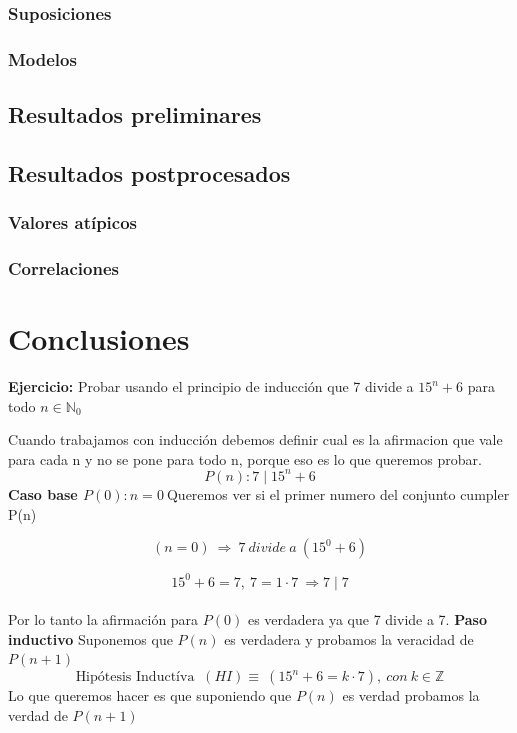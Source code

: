 \documentclass[12pt]{book}
\begin{document}
\subsection{Suposiciones}
\subsection{Modelos}
\section{Resultados preliminares}
\section{Resultados postprocesados}
\subsection{Valores atípicos}
\subsection{Correlaciones}
\chapter{Conclusiones}


\begin{shaded}
\textbf{Ejercicio:} Probar usando el principio de inducción que 7 divide a $ 15^{n} + 6$ para todo $n \in \mathbb N_{0}$  
\end{shaded}

Cuando trabajamos con inducci\'on debemos definir cual es la afirmacion que vale para cada n   y no se pone para todo n, porque eso es lo que queremos probar.\\
\[
 P(n): 7 \mid 15^{n} + 6
\]
\newline
\textbf{Caso base $P(0): n = 0  \ $}\quad Queremos ver si el primer numero del conjunto cumpler P(n)

\[
(n=0 ) \ \Rightarrow \ 7 \ divide \ a \ (15^{0} + 6 )
\]

\[  15^{0} + 6 = 7  , \  7 = 1 \cdot 7  \ \Rightarrow 7\mid 7 \]
\\
Por lo tanto la afirmaci\'on para $P(0)$  es verdadera ya que 7 divide a 7.
\newline
\newline
\textbf{Paso inductivo} Suponemos que $P(n)$ es verdadera y probamos la veracidad de $P(n+1)$
\[
\text {Hip\'otesis  Induct\'iva } \ (HI) \equiv \ (15^{n} + 6 = k \cdot 7) ,\ con \ k \in \mathbb{Z} 
\]
\newline
Lo que queremos hacer es que suponiendo que $P(n)$ es verdad probamos la verdad de $P(n+1)$
\end{document}
